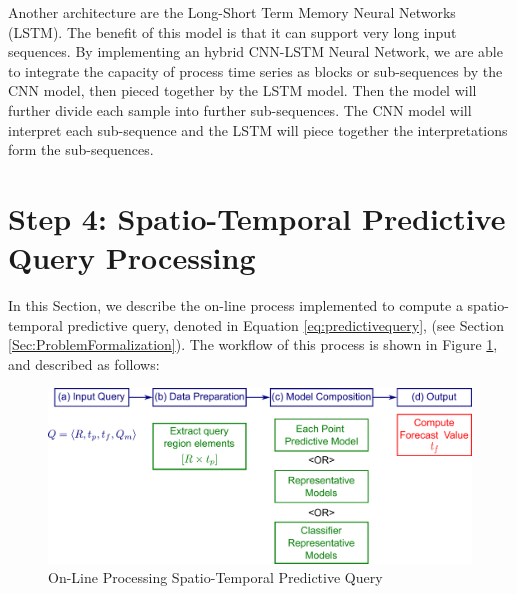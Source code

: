 Another architecture are the Long-Short Term Memory Neural Networks (LSTM). The benefit of this model is that it can support very long input sequences. By implementing an hybrid CNN-LSTM Neural Network, we are able to integrate the capacity of process time series as blocks or sub-sequences by the CNN model, then pieced together by the LSTM model. Then the model will further divide each sample into further sub-sequences. The CNN model will interpret each sub-sequence and the LSTM will piece together the interpretations form the sub-sequences. 


\section{Step 4: Spatio-Temporal Predictive Query Processing}
\label{Sec:SpatioTemporalQueryProcessing}	

In this Section, we describe the on-line process implemented to compute a spatio-temporal predictive query, denoted in Equation \ref{eq:predictivequery}, (see Section \ref{Sec:ProblemFormalization}). The workflow of this process is shown in Figure \ref{Fig:OnLineQP}, and described as follows: 

\begin{figure}[h]
	\centering
	\includegraphics[scale=0.35]{../Figures/Query_Processing}
	\caption{On-Line Processing Spatio-Temporal Predictive Query}
	\label{Fig:OnLineQP}
\end{figure}

